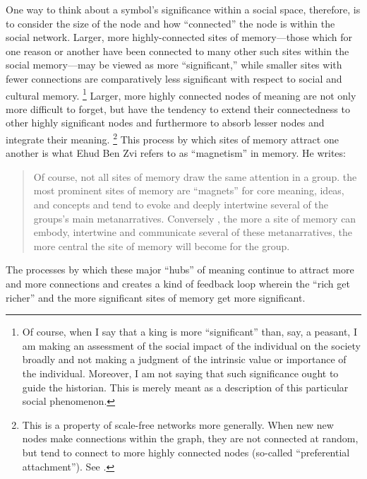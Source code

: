 One way to think about a symbol's significance within a social space, therefore, is to consider the size of the node and how ``connected'' the node is within the social network. Larger, more highly-connected sites of memory---those which for one reason or another have been connected to many other such sites within the social memory---may be viewed as more ``significant,'' while smaller sites with fewer connections are comparatively less significant with respect to social and cultural memory.%
    \footnote{Of course, when I say that a king is more ``significant'' than, say, a peasant, I am making an assessment of the social impact of the individual on the society broadly and not making a judgment of the intrinsic value or importance of the individual. Moreover, I am not saying that such significance ought to guide the historian. This is merely meant as a description of this particular social phenomenon.}
Larger, more highly connected nodes of meaning are not only more difficult to forget, but have the tendency to extend their connectedness to other highly significant nodes and furthermore to absorb lesser nodes and integrate their meaning.%
    \footnote{This is a property of scale-free networks more generally. When new new nodes make connections within the graph, they are not connected at random, but tend to connect to more highly connected nodes (so-called ``preferential attachment''). See \cite[412]{barabasi_science2009}.}
This process by which sites of memory attract one another is what Ehud Ben Zvi refers to as ``magnetism'' in memory. He writes:
\begin{quote}
    Of course, not all sites of memory draw the same attention in a group. the most prominent sites of memory are ``magnets'' for core meaning, ideas, and concepts and tend to evoke and deeply intertwine several of the groups's main metanarratives. Conversely , the more a site of memory can embody, intertwine and communicate several of these metanarratives, the more central the site of memory will become for the group.\autocite[73]{benzvi_st2017}
\end{quote}
The processes by which these major ``hubs'' of meaning continue to attract more and more connections and creates a kind of feedback loop wherein the ``rich get richer'' and the more significant sites of memory get more significant.\autocite[412]{barabasi_science2009}

